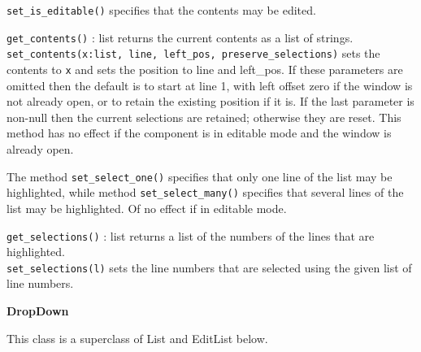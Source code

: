 \texttt{set\_is\_editable()} specifies that the contents may be edited.

\texttt{get\_contents()} : list returns the current contents as a list of
strings.\\
\texttt{set\_contents(x:list, line, left\_pos, preserve\_selections)} sets the
contents to \texttt{x} and sets the position to line and left\_pos. If
these parameters are omitted then the default is to start at line 1,
with left offset zero if the window is not already open, or to retain
the existing position if it is. If the last parameter is non-null then
the current selections are retained; otherwise they are reset. This
method has no effect if the component is in editable mode and the
window is already open.


The method \texttt{set\_select\_one()} specifies that only one line of the list
may be highlighted, while method \texttt{set\_select\_many()} specifies that
several lines of the list may be highlighted. Of no effect if in editable mode.

\texttt{get\_selections()} : list returns a list of the numbers of the lines
that are highlighted.\\
\texttt{set\_selections(l)} sets the line numbers that are selected using the
given list of line numbers.


{\ttfamily\bfseries
{}DropDown}

This class is a superclass of List and EditList below.

